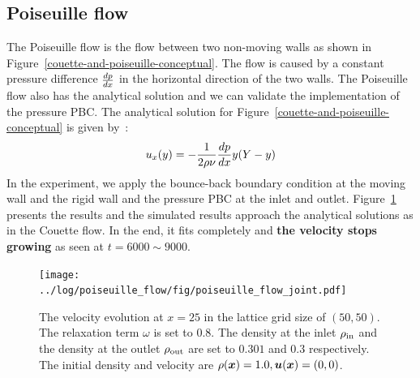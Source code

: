 \subsection{Poiseuille flow}
The Poiseuille flow is the flow between two non-moving walls as shown in Figure~\ref{couette-and-poiseuille-conceptual}.
The flow is caused by a constant pressure difference $\frac{d p}{d x}$
in the horizontal direction of the two walls.
The Poiseuille flow also has the analytical solution
and we can validate the implementation of the pressure PBC.
The analytical solution for Figure~\ref{couette-and-poiseuille-conceptual} is given by~\cite{mendiburu2009analytical}:
\begin{equation}
\begin{aligned}
  u_x(y) = - \frac{1}{2\rho \nu} \frac{d p}{d x} y (Y - y)
\end{aligned}
\end{equation}
In the experiment, we apply the bounce-back boundary condition
at the moving wall and the rigid wall
and the pressure PBC at the inlet and outlet.
Figure~\ref{fig:poiseuille-velocity-evolution} presents the results
and the simulated results approach the analytical solutions as in the Couette flow.
In the end, it fits completely
and {\bf the velocity stops growing} as seen at $t=6000 \sim 9000$.

\begin{figure}[H]
  \centering
  \texttt{[image: ../log/poiseuille\_flow/fig/poiseuille\_flow\_joint.pdf]}
  \vspace{-3mm}
  \caption{The velocity evolution at
  $x = 25$ in the lattice grid size of $(50, 50)$.
  The relaxation term $\omega$ is set to $0.8$.
  The density at the inlet $\rho_{\rm in}$ and the density
  at the outlet $\rho_{\rm out}$ are set to $0.301$ and $0.3$ respectively.
  The initial density and velocity are $\rho(\boldsymbol{x}) = 1.0, \boldsymbol{u}(\boldsymbol{x}) = (0, 0)$.
  \label{fig:poiseuille-velocity-evolution}}
\end{figure}

